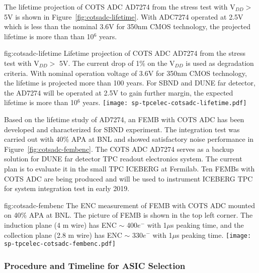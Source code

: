 The lifetime projection of COTS ADC AD7274 from the stress test with V$_{DD} >$ 5V is shown in Figure~\ref{fig:cotsadc-lifetime}. With ADC7274 operated at 2.5V which is less than the nominal 3.6V for 350nm CMOS technology, the projected lifetime is more than than 10$^6$ years.

\begin{dunefigure}
{fig:cotsadc-lifetime}
{Lifetime projection of COTS ADC AD7274 from the stress test with V$_{DD} >$ 5V. The current drop of 1\% on the V$_{DD}$ is used as degradation criteria. With nominal operation voltage of 3.6V for 350nm CMOS technology, the lifetime is projected more than 100 years. For SBND and DUNE far detector, the AD7274 will be operated at 2.5V to gain further margin, the expected lifetime is more than 10$^6$ years.}
\texttt{[image: sp-tpcelec-cotsadc-lifetime.pdf]}
\end{dunefigure}

Based on the lifetime study of AD7274, an FEMB with COTS ADC has been developed and characterized for SBND experiment. The integration test was carried out with 40\% APA at BNL and showed satisfactory noise performance in Figure~\ref{fig:cotsadc-fembenc}. The COTS ADC AD7274 serves as a backup solution for DUNE far detector TPC readout electronics system. The current plan is to evaluate it in the small TPC ICEBERG at Fermilab. Ten FEMBs with COTS ADC are being produced and will be used to instrument ICEBERG TPC for system integration test in early 2019. 

\begin{dunefigure}
{fig:cotsadc-fembenc}
{The ENC measurement of FEMB with COTS ADC mounted on 40\% APA at BNL. The picture of FEMB is shown in the top left corner. The induction plane (4 m wire) has ENC $\sim$ 400$e^-$ with 1$\mu$s peaking time, and the collection plane (2.8 m wire) has ENC $\sim$ 330$e^-$ with 1$\mu$s peaking time.}
\texttt{[image: sp-tpcelec-cotsadc-fembenc.pdf]}
\end{dunefigure}

\subsubsection{Procedure and Timeline for ASIC Selection}
\label{sec:fdsp-tpcelec-design-femb-selection}

